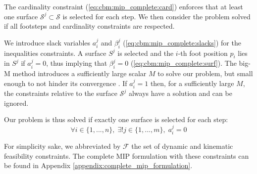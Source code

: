 The cardinality constraint (\ref{eq:cbm:mip_complete:card}) enforces that at least one surface $\mathcal{S}^j \subset \mathcal{S}$ is selected for each step.
We then consider the problem solved if all footsteps and cardinality constraints are respected. 

We introduce slack variables $a_i^j$ and $\beta_i^j$ (\ref{eq:cbm:mip_complete:slacks}) for the inequalities constraints. %
A surface $S^j$ is selected and the $i$-th foot position $p_i$ lies in  $S^j$ if $a_i^j = 0$, thus implying that $\beta_i^j = 0$ (\ref{eq:cbm:mip_complete:surf}).
The big-M method introduces a sufficiently large scalar $M$ to solve our problem, but small enough to not hinder its convergence \cite{big_M_danger}.
If $a_i^j = 1$ then, for a sufficiently large $M$, the constraints relative to the surface $\mathcal{S}^j$ always have a solution and can be ignored.

Our problem is thus solved if exactly one surface is selected for each step:
\begin{equation}
    \forall i \in \{1,...,n\},\; \exists! j \in \{1,...,m\},\; a^j_i = 0
\end{equation}

For simplicity sake, we abbreviated by $\mathcal{F}$ the set of dynamic and kinematic feasibility constraints.
The complete MIP formulation with these constraints can be found in Appendix \ref{appendix:complete_mip_formulation}.

